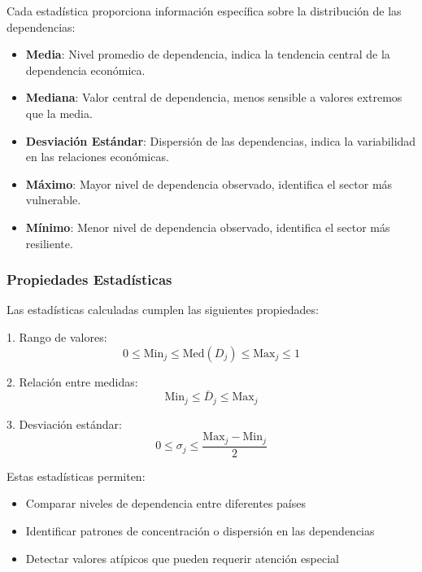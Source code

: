 \documentclass[11pt,a4paper]{article}
\begin{document}
Cada estadística proporciona información específica sobre la distribución de las dependencias:

\begin{itemize}
    \item \textbf{Media}: Nivel promedio de dependencia, indica la tendencia central de la dependencia económica.
    
    \item \textbf{Mediana}: Valor central de dependencia, menos sensible a valores extremos que la media.
    
    \item \textbf{Desviación Estándar}: Dispersión de las dependencias, indica la variabilidad en las relaciones económicas.
    
    \item \textbf{Máximo}: Mayor nivel de dependencia observado, identifica el sector más vulnerable.
    
    \item \textbf{Mínimo}: Menor nivel de dependencia observado, identifica el sector más resiliente.
\end{itemize}

\subsubsection{Propiedades Estadísticas}

Las estadísticas calculadas cumplen las siguientes propiedades:

1. Rango de valores:
\begin{equation}
0 \leq \text{Min}_j \leq \text{Med}(D_j) \leq \text{Max}_j \leq 1
\end{equation}

2. Relación entre medidas:
\begin{equation}
\text{Min}_j \leq \bar{D}_j \leq \text{Max}_j
\end{equation}

3. Desviación estándar:
\begin{equation}
0 \leq \sigma_j \leq \frac{\text{Max}_j - \text{Min}_j}{2}
\end{equation}

Estas estadísticas permiten:
\begin{itemize}
    \item Comparar niveles de dependencia entre diferentes países
    \item Identificar patrones de concentración o dispersión en las dependencias
    \item Detectar valores atípicos que pueden requerir atención especial
\end{itemize}
\end{document}
